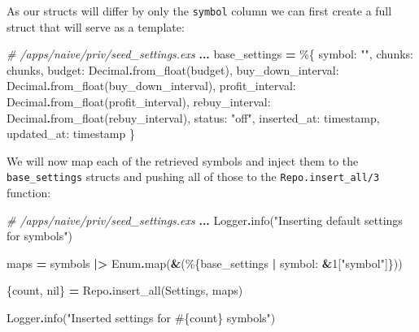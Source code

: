 \documentclass[
  oneside]{book}
\newenvironment{Shaded}{\begin{snugshade}}{\end{snugshade}}
\newcommand{\CommentTok}[1]{\textcolor[rgb]{0.56,0.35,0.01}{\textit{#1}}}
\newcommand{\ConstantTok}[1]{\textcolor[rgb]{0.00,0.00,0.00}{#1}}
\newcommand{\DecValTok}[1]{\textcolor[rgb]{0.00,0.00,0.81}{#1}}
\newcommand{\NormalTok}[1]{#1}
\newcommand{\OperatorTok}[1]{\textcolor[rgb]{0.81,0.36,0.00}{\textbf{#1}}}
\newcommand{\OtherTok}[1]{\textcolor[rgb]{0.56,0.35,0.01}{#1}}
\newcommand{\StringTok}[1]{\textcolor[rgb]{0.31,0.60,0.02}{#1}}
\newcommand{\VariableTok}[1]{\textcolor[rgb]{0.00,0.00,0.00}{#1}}
\begin{document}
As our structs will differ by only the \texttt{symbol} column we can first create a full struct that will serve as a template:

\begin{Shaded}
\begin{Highlighting}[]
\CommentTok{\# /apps/naive/priv/seed\_settings.exs}
\OperatorTok{...}
\NormalTok{base\_settings }\OperatorTok{=}\NormalTok{ \%\{}
  \VariableTok{symbol:} \StringTok{""}\NormalTok{,}
  \VariableTok{chunks:}\NormalTok{ chunks,}
  \VariableTok{budget:} \ConstantTok{Decimal}\OperatorTok{.}\NormalTok{from\_float(budget),}
  \VariableTok{buy\_down\_interval:} \ConstantTok{Decimal}\OperatorTok{.}\NormalTok{from\_float(buy\_down\_interval),}
  \VariableTok{profit\_interval:} \ConstantTok{Decimal}\OperatorTok{.}\NormalTok{from\_float(profit\_interval),}
  \VariableTok{rebuy\_interval:} \ConstantTok{Decimal}\OperatorTok{.}\NormalTok{from\_float(rebuy\_interval),}
  \VariableTok{status:} \StringTok{"off"}\NormalTok{,}
  \VariableTok{inserted\_at:}\NormalTok{ timestamp,}
  \VariableTok{updated\_at:}\NormalTok{ timestamp}
\NormalTok{\}}
\end{Highlighting}
\end{Shaded}

We will now map each of the retrieved symbols and inject them to the \texttt{base\_settings} structs and pushing all of those to the \texttt{Repo.insert\_all/3} function:

\begin{Shaded}
\begin{Highlighting}[]
\CommentTok{\# /apps/naive/priv/seed\_settings.exs}
\OperatorTok{...}
\ConstantTok{Logger}\OperatorTok{.}\NormalTok{info(}\StringTok{"Inserting default settings for symbols"}\NormalTok{)}

\NormalTok{maps }\OperatorTok{=}\NormalTok{ symbols}
  \OperatorTok{|\textgreater{}} \ConstantTok{Enum}\OperatorTok{.}\NormalTok{map(}\OperatorTok{\&}\NormalTok{(\%\{base\_settings }\OperatorTok{|} \VariableTok{symbol:} \OperatorTok{\&}\DecValTok{1}\NormalTok{[}\StringTok{"symbol"}\NormalTok{]\}))}

\NormalTok{\{count, }\ConstantTok{nil}\NormalTok{\} }\OperatorTok{=} \ConstantTok{Repo}\OperatorTok{.}\NormalTok{insert\_all(}\ConstantTok{Settings}\NormalTok{, maps)}

\ConstantTok{Logger}\OperatorTok{.}\NormalTok{info(}\StringTok{"Inserted settings for }\OtherTok{\#\{}\NormalTok{count}\OtherTok{\}}\StringTok{ symbols"}\NormalTok{)}
\end{Highlighting}
\end{Shaded}
\end{document}
